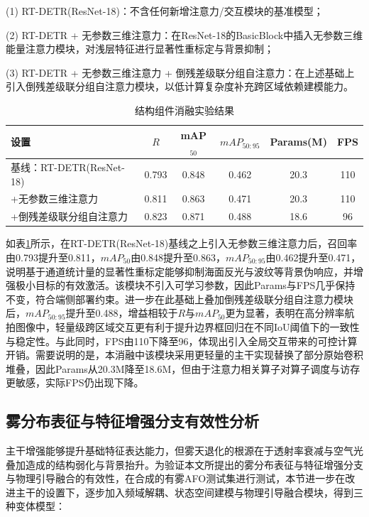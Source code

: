 (1) {RT-DETR(ResNet-18)}：不含任何新增注意力/交互模块的基准模型；

(2) {RT-DETR + 无参数三维注意力}：在ResNet-18的BasicBlock中插入无参数三维能量注意力模块，对浅层特征进行显著性重标定与背景抑制；

(3) {RT-DETR + 无参数三维注意力 + 倒残差级联分组自注意力}：在上述基础上引入倒残差级联分组自注意力模块，以低计算复杂度补充跨区域依赖建模能力。

\begin{table}[!htbp]
\centering
\caption{结构组件消融实验结果}
\label{tab:ablation_modules}
\begin{tabular}{l c c c c c}
\hline
设置 & $R$ & mAP$_{50}$ &  $mAP_{50:95}$  & Params(M) & FPS \\
\hline
基线：RT-DETR(ResNet-18) & 0.793 & 0.848 & 0.462 & 20.3 & 110 \\
+无参数三维注意力 & 0.811 & 0.863 & 0.471 & 20.3 & 110 \\
+倒残差级联分组自注意力 & 0.823 & 0.871 & 0.488 & 18.6 & 96 \\
\hline
\end{tabular}

\vspace{2mm}
\end{table}


如表\ref{tab:ablation_modules}所示，在RT-DETR(ResNet-18)基线之上引入无参数三维注意力后，召回率由0.793提升至0.811，$mAP_{50}$由0.848提升至0.863，$mAP_{50:95}$由0.462提升至0.471，说明基于通道统计量的显著性重标定能够抑制海面反光与波纹等背景伪响应，并增强极小目标的有效激活。该模块不引入可学习参数，因此Params与FPS几乎保持不变，符合端侧部署约束。进一步在此基础上叠加倒残差级联分组自注意力模块后，$mAP_{50:95}$提升至0.488，增益相较于$R$与$mAP_{50}$更为显著，表明在高分辨率航拍图像中，轻量级跨区域交互更有利于提升边界框回归在不同IoU阈值下的一致性与稳定性。与此同时，FPS由110下降至96，体现出引入全局交互带来的可控计算开销。需要说明的是，本消融中该模块采用更轻量的主干实现替换了部分原始卷积堆叠，因此Params从20.3M降至18.6M，但由于注意力相关算子对算子调度与访存更敏感，实际FPS仍出现下降。

\subsection{雾分布表征与特征增强分支有效性分析}
\label{subsec:ablation_fog_pgm}

主干增强能够提升基础特征表达能力，但雾天退化的根源在于透射率衰减与空气光叠加造成的结构弱化与背景抬升。为验证本文所提出的雾分布表征与特征增强分支与物理引导融合的有效性，在合成的有雾AFO测试集进行测试，本节进一步在改进主干的设置下，逐步加入频域解耦、状态空间建模与物理引导融合模块，得到三种变体模型：

